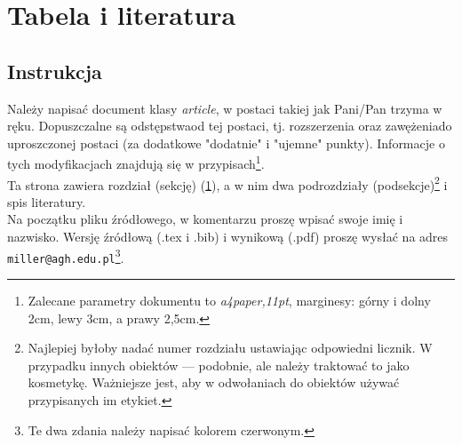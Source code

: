 \documentclass[a4paper,11pt]{article}
\begin{document}
    \section{Tabela i literatura}
    \label{r36}
        \subsection{Instrukcja}
        Należy napisać document klasy \textit{article}, w postaci takiej jak Pani/Pan trzyma w ręku.
        Dopuszczalne są odstępstwaod tej postaci, tj. rozszerzenia oraz zawężeniado uproszczonej postaci (za dodatkowe "dodatnie" i "ujemne" punkty). Informacje o tych modyfikacjach znajdują się w przypisach\footnote{
        Zalecane parametry dokumentu to \textit{a4paper,11pt}, marginesy: górny i dolny 2cm, lewy 3cm, a prawy 2,5cm.}.\\
        \indent Ta strona zawiera rozdział (sekcję) (\ref{r36}), a w nim dwa podrozdziały (podsekcje)\footnote{
        Najlepiej byłoby nadać numer rozdziału ustawiając odpowiedni licznik. W przypadku innych obiektów --- podobnie, ale należy traktować to jako kosmetykę. Ważniejsze jest, aby w odwołaniach do obiektów używać przypisanych im etykiet. 
        } i spis literatury. \\
		 \indent\color{red}Na początku pliku źródłowego, w komentarzu proszę wpisać swoje imię i nazwisko.
		 Wersję źródłową (.tex i .bib) i wynikową (.pdf) proszę wysłać na adres \texttt{miller@agh.edu.pl}\color{black}\footnote{
		 	Te dwa zdania należy napisać kolorem czerwonym.
		 }.
\end{document}
